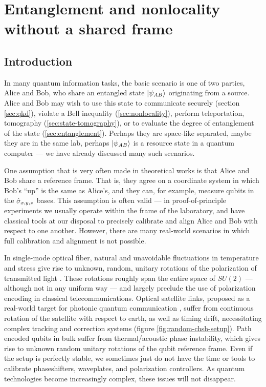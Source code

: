 
\chapter{Entanglement and nonlocality without a shared frame}
\label{chap:random-chsh}

\section{Introduction}
\label{sec:random-chsh-intro}

In many quantum information tasks, the basic scenario is one of two parties, Alice and Bob, who share an entangled state $\mbox{$ | \psi_{AB} \rangle $}$ originating from a source. Alice and Bob may wish to use this state to communicate securely (section \ref{sec:qkd}), violate a Bell inequality (\ref{sec:nonlocality}), perform teleportation, tomography (\ref{sec:state-tomography}), or to evaluate the degree of entanglement of the state (\ref{sec:entanglement}). Perhaps they are space-like separated, maybe they are in the same lab, perhaps $\mbox{$ | \psi_{AB} \rangle $}$ is a resource state in a quantum computer --- we have already discussed many such scenarios.

One assumption that is very often made in theoretical works is that Alice and Bob share a reference frame. That is, they agree on a coordinate system in which Bob's ``up'' is the same as Alice's, and they can, for example, measure qubits in the $\hat{\sigma}_{x,y,z}$ bases. This assumption is often valid --- in proof-of-principle experiments we usually operate within the frame of the laboratory, and have classical tools at our disposal to precisely calibrate and align Alice and Bob with respect to one another. However, there are many real-world scenarios in which full calibration and alignment is not possible.

In single-mode optical fiber, natural and unavoidable fluctuations in temperature and stress give rise to unknown, random, unitary rotations of the polarization of transmitted light \cite{Gisin2002}. 
These rotations roughly span the entire space of $SU(2)$ --- although not in any uniform way --- and largely preclude the use of polarization encoding in classical telecommunications. 
Optical satellite links, proposed as a real-world target for photonic quantum communication \cite{Wang2013, Ursin2009, Zhang2013},  suffer from continuous rotation of the satellite with respect to earth, as well as timing drift, necessitating complex tracking and correction systems 
(figure \ref{fig:random-chsh-setup}).
Path encoded qubits in bulk suffer from thermal/acoustic phase instability, which gives rise to unknown random unitary rotations of the qubit reference frame.
Even if the setup is perfectly stable, we sometimes just do not have the time or tools to calibrate phaseshifters, waveplates, and polarization controllers. 
As quantum technologies become increasingly complex, these issues will not disappear.

